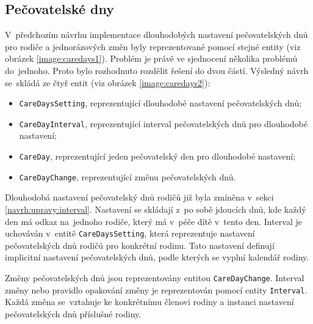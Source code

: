     \subsection{Pečovatelské dny}\label{navrh:upravy:caredays} %
        V~předchozím návrhu implementace dlouhodobých nastavení pečovatelských dnů pro rodiče a jednorázových změn byly reprezentované pomocí stejné entity (viz obrázek \ref{image:caredays1}). Problém je právě ve sjednocení několika problémů do~jednoho. Proto bylo rozhodnuto rozdělit řešení do dvou částí. Výsledný návrh se~skládá ze čtyř entit (viz obrázek \ref{image:caredays2}):
        \begin{itemize}
            \item \texttt{CareDaysSetting}, reprezentující dlouhodobé nastavení pečovatelských dnů;
            \item \texttt{CareDayInterval}, reprezentující interval pečovatelských dnů pro dlouhodobé nastavení;
            \item \texttt{CareDay}, reprezentující jeden pečovatelský den pro dlouhodobé nastavení;
            \item \texttt{CareDayChange}, reprezentující změnu pečovatelských dnů.
        \end{itemize}
        Dlouhodobá nastavení pečovatelský dnů rodičů již byla zmíněna v~sekci \ref{navrh:upravy:interval}. Nastavení se skládají z~po sobě jdoucích dnů, kde každý den má odkaz na~jednoho rodiče, který má v~péče dítě v~tento den. Interval je uchováván v~entitě \verb|CareDaysSetting|, která reprezentuje nastavení pečovatelských dnů rodičů pro konkrétní rodinu. Tato nastavení definují implicitní nastavení pečovatelských dnů, podle kterých se vyplní kalendář rodiny.
        
        Změny pečovatelských dnů jsou reprezentovány entitou \verb|CareDayChange|. Interval změny nebo pravidlo opakování změny je reprezentován pomocí entity \verb|Interval|. Každá změna se~vztahuje ke konkrétnímu členovi rodiny a instanci nastavení pečovatelských dnů příslušné rodiny.
        
